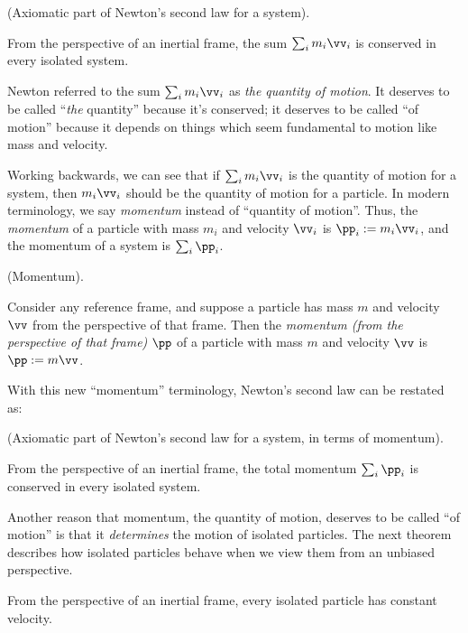 \documentclass{article}
\begin{document}
\begin{axiom}
\label{N2_part1_axiom}
    (Axiomatic part of Newton's second law for a system).
    
    From the perspective of an inertial frame, the sum $\sum_i m_i \vv_i$ is conserved in every isolated system.
\end{axiom}

Newton referred to the sum $\sum_i m_i \vv_i$ as \textit{the quantity of motion}. It deserves to be called ``\textit{the} quantity'' because it's conserved; it deserves to be called ``of motion'' because it depends on things which seem fundamental to motion like mass and velocity.

Working backwards, we can see that if $\sum_i m_i \vv_i$ is the quantity of motion for a system, then $m_i \vv_i$ should be the quantity of motion for a particle. In modern terminology, we say \textit{momentum} instead of ``quantity of motion''. Thus, the \textit{momentum} of a particle with mass $m_i$ and velocity $\vv_i$ is $\pp_i := m_i \vv_i$, and the momentum of a system is $\sum_i \pp_i$.

\begin{defn}
    (Momentum).

    Consider any reference frame, and suppose a particle has mass $m$ and velocity $\vv$ from the perspective of that frame. Then the \textit{momentum (from the perspective of that frame)} $\pp$ of a particle with mass $m$ and velocity $\vv$ is $\pp := m \vv$.
\end{defn}

With this new ``momentum'' terminology, Newton's second law can be restated as:

\begin{axiom}
    \label{N2_part1_restated_momentum}
    (Axiomatic part of Newton's second law for a system, in terms of momentum).
    
    From the perspective of an inertial frame, the total momentum $\sum_i \pp_i$ is conserved in every isolated system.
\end{axiom}

Another reason that momentum, the quantity of motion, deserves to be called ``of motion'' is that it \textit{determines} the motion of isolated particles. The next theorem describes how isolated particles behave when we view them from an unbiased perspective.

\begin{theorem}
    \label{thm_isolated_particle_constant_velocity}
    From the perspective of an inertial frame, every isolated particle has constant velocity. 
\end{theorem}
\end{document}
